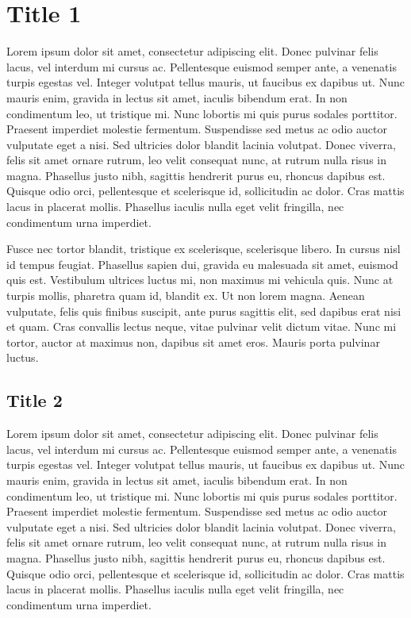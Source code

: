 \documentclass{ideathon2026}
\begin{document}
\makecover
\tocfirstsubstop{33bp} %
\tableofcontents

\section{Title 1}

Lorem ipsum dolor sit amet, consectetur adipiscing elit. Donec pulvinar felis lacus, vel interdum mi cursus ac. Pellentesque euismod semper ante, a venenatis turpis egestas vel. Integer volutpat tellus mauris, ut faucibus ex dapibus ut. Nunc mauris enim, gravida in lectus sit amet, iaculis bibendum erat. In non condimentum leo, ut tristique mi. Nunc lobortis mi quis purus sodales porttitor. Praesent imperdiet molestie fermentum. Suspendisse sed metus ac odio auctor vulputate eget a nisi. Sed ultricies dolor blandit lacinia volutpat. Donec viverra, felis sit amet ornare rutrum, leo velit consequat nunc, at rutrum nulla risus in magna. Phasellus justo nibh, sagittis hendrerit purus eu, rhoncus dapibus est. Quisque odio orci, pellentesque et scelerisque id, sollicitudin ac dolor. Cras mattis lacus in placerat mollis. Phasellus iaculis nulla eget velit fringilla, nec condimentum urna imperdiet.

Fusce nec tortor blandit, tristique ex scelerisque, scelerisque libero. In cursus nisl id tempus feugiat. Phasellus sapien dui, gravida eu malesuada sit amet, euismod quis est. Vestibulum ultrices luctus mi, non maximus mi vehicula quis. Nunc at turpis mollis, pharetra quam id, blandit ex. Ut non lorem magna. Aenean vulputate, felis quis finibus suscipit, ante purus sagittis elit, sed dapibus erat nisi et quam. Cras convallis lectus neque, vitae pulvinar velit dictum vitae. Nunc mi tortor, auctor at maximus non, dapibus sit amet eros. Mauris porta pulvinar luctus.

\subsection{Title 2}

Lorem ipsum dolor sit amet, consectetur adipiscing elit. Donec pulvinar felis lacus, vel interdum mi cursus ac. Pellentesque euismod semper ante, a venenatis turpis egestas vel. Integer volutpat tellus mauris, ut faucibus ex dapibus ut. Nunc mauris enim, gravida in lectus sit amet, iaculis bibendum erat. In non condimentum leo, ut tristique mi. Nunc lobortis mi quis purus sodales porttitor. Praesent imperdiet molestie fermentum. Suspendisse sed metus ac odio auctor vulputate eget a nisi. Sed ultricies dolor blandit lacinia volutpat. Donec viverra, felis sit amet ornare rutrum, leo velit consequat nunc, at rutrum nulla risus in magna. Phasellus justo nibh, sagittis hendrerit purus eu, rhoncus dapibus est. Quisque odio orci, pellentesque et scelerisque id, sollicitudin ac dolor. Cras mattis lacus in placerat mollis. Phasellus iaculis nulla eget velit fringilla, nec condimentum urna imperdiet.
\end{document}
